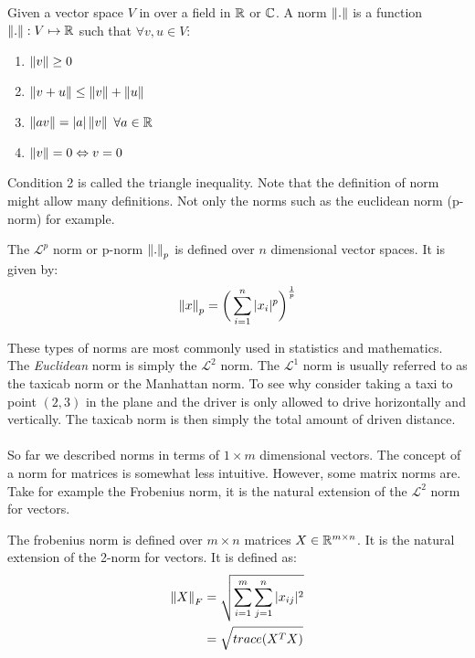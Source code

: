 \begin{defn} 
Given a vector space $V$ in over a field in $\mathbb{R}$ or 
$\mathbb{C}$. A norm $\left\lVert.\right\rVert$ is a function 
$\left\lVert.\right\rVert:V \mapsto \mathbb{R}$ such that $\forall v, u \in V$:

\begin{enumerate}
\item $\left\lVert v\right\rVert \geq 0$
\item $\left\lVert v + u\right\rVert \leq \left\lVert v\right\rVert + \left\lVert u\right\rVert$
\item $\left\lVert av\right\rVert = |a|\left\lVert v\right\rVert$ $\forall a \in \mathbb{R}$
\item $\left\lVert v\right\rVert = 0 \Leftrightarrow v = 0$
\end{enumerate}

Condition 2 is called the triangle inequality. Note that
the definition of norm might allow many definitions. 
Not only the norms such as the euclidean norm (p-norm) for example.
\end{defn}
\begin{defn}
The $\mathcal{L}^p$ norm or p-norm $\left\lVert.\right\rVert_p$ is 
defined over $n$ dimensional vector spaces. It is given by:
\begin{equation}
\left\lVert x\right\rVert_p = \bigg( \sum_{i=1}^{n} |x_i|^p \bigg)^\frac{1}{p}
\end{equation}
\end{defn}
These types of norms are most commonly used in 
statistics and mathematics. The \textit{Euclidean} norm is
simply the $\mathcal{L}^2$ norm. The $\mathcal{L}^1$ norm is
usually referred to as the taxicab norm or the 
Manhattan norm. To see why consider taking a taxi to point
$(2,3)$ in the plane and the driver is only allowed to drive
horizontally and vertically. The taxicab norm is then
simply the total amount of driven distance.
\\\\
So far we described norms in terms of $1 \times m$ 
dimensional vectors. The concept of a norm for matrices is 
somewhat less intuitive. However, some matrix norms are.
Take for example the Frobenius norm, it is the natural extension
of the $\mathcal{L}^2$ norm for vectors.
\begin{defn}
The frobenius norm is defined over $m\times n$ 
matrices $X \in \mathbb{R}^{m \times n}$. It is the 
natural extension of the 2-norm for vectors. It is defined as: 
\begin{equation}
\label{eq:def_frobenius}
\begin{split}
\left\lVert X\right\rVert_F &= \sqrt{\sum_{i=1}^{m}\sum_{j=1}^{n}|x_{ij}|^2}\\
&= \sqrt{trace(X^TX)} \\
\end{split}
\end{equation}
\end{defn}
